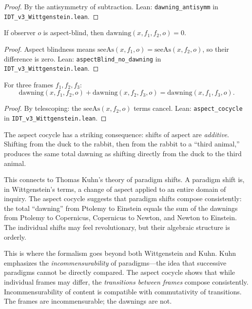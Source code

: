 \begin{proof}
By the antisymmetry of subtraction.
Lean: \texttt{dawning\_antisymm} in \texttt{IDT\_v3\_Wittgenstein.lean}.
\end{proof}

\begin{theorem}
\label{thm:blind-no-dawning}
If observer $o$ is aspect-blind, then $\mathrm{dawning}(x, f_1, f_2, o) = 0$.
\end{theorem}

\begin{proof}
Aspect blindness means $\mathrm{seeAs}(x, f_1, o) = \mathrm{seeAs}(x, f_2, o)$,
so their difference is zero.
Lean: \texttt{aspectBlind\_no\_dawning} in \texttt{IDT\_v3\_Wittgenstein.lean}.
\end{proof}

\begin{theorem}
\label{thm:aspect-cocycle}
For three frames $f_1, f_2, f_3$:
\[
\mathrm{dawning}(x, f_1, f_2, o) + \mathrm{dawning}(x, f_2, f_3, o)
= \mathrm{dawning}(x, f_1, f_3, o).
\]
\end{theorem}

\begin{proof}
By telescoping: the $\mathrm{seeAs}(x, f_2, o)$ terms cancel.
Lean: \texttt{aspect\_cocycle} in \texttt{IDT\_v3\_Wittgenstein.lean}.
\end{proof}

\begin{interpretation}
The aspect cocycle has a striking consequence: shifts of aspect are
\emph{additive}. Shifting from the duck to the rabbit, then from the rabbit
to a ``third animal,'' produces the same total dawning as shifting directly
from the duck to the third animal.

This connects to Thomas Kuhn's theory of paradigm shifts. A paradigm shift
is, in Wittgenstein's terms, a change of aspect applied to an entire domain
of inquiry. The aspect cocycle suggests that paradigm shifts compose
consistently: the total ``dawning'' from Ptolemy to Einstein equals the sum
of the dawnings from Ptolemy to Copernicus, Copernicus to Newton, and Newton
to Einstein. The individual shifts may feel revolutionary, but their algebraic
structure is orderly.

This is where the formalism goes beyond both Wittgenstein and Kuhn. Kuhn
emphasizes the \emph{incommensurability} of paradigms---the idea that
successive paradigms cannot be directly compared. The aspect cocycle shows
that while individual frames may differ, the \emph{transitions between frames}
compose consistently. Incommensurability of content is compatible with
commutativity of transitions. The frames are incommensurable; the dawnings
are not.
\end{interpretation}

